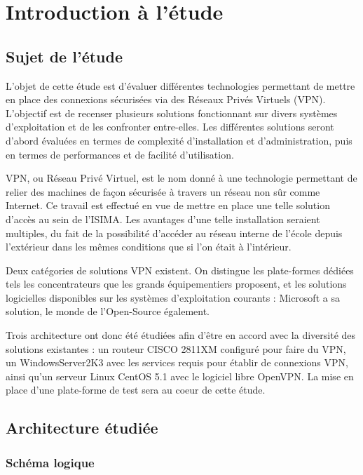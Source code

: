 \section{Introduction à l'étude}
\subsection{Sujet de l'étude}
L'objet de cette étude est d'évaluer différentes technologies permettant de mettre en place des connexions sécurisées via des Réseaux Privés Virtuels (VPN). L'objectif est de recenser plusieurs solutions fonctionnant sur divers systèmes d'exploitation et de les confronter entre-elles. Les différentes solutions seront d'abord évaluées en termes de complexité d'installation et d'administration, puis en termes de performances et de facilité d'utilisation.

VPN, ou Réseau Privé Virtuel, est le nom donné à une technologie permettant de relier des machines de façon sécurisée à travers un réseau non sûr comme Internet. Ce travail est effectué en vue de mettre en place une telle solution d'accès au sein de l'ISIMA. Les avantages d'une telle installation seraient multiples, du fait de la possibilité d'accéder au réseau interne de l'école depuis l'extérieur dans les mêmes conditions que si l'on était à l'intérieur.

Deux catégories de solutions VPN existent. On distingue les plate-formes dédiées tels les concentrateurs que les grands équipementiers proposent, et les solutions logicielles disponibles sur les systèmes d'exploitation courants : Microsoft a sa solution, le monde de l'Open-Source également.

Trois architecture ont donc été étudiées afin d'être en accord avec la diversité des solutions existantes : un routeur CISCO 2811XM configuré pour faire du VPN, un WindowsServer2K3 avec les services requis pour établir de connexions VPN, ainsi qu'un serveur Linux CentOS 5.1 avec le logiciel libre OpenVPN. La mise en place d'une plate-forme de test sera au coeur de cette étude.

\subsection{Architecture étudiée}
\subsubsection{Schéma logique}

